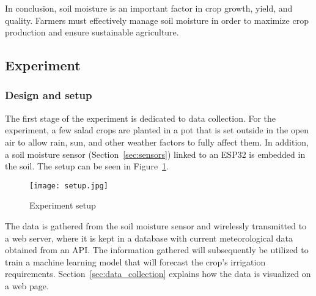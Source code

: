 \documentclass[11pt]{scrartcl} %
\begin{document}
\newline In conclusion, soil moisture is an important factor in crop growth, yield, and quality. Farmers must effectively manage soil moisture in order to maximize crop production and ensure sustainable agriculture.


\subsection{Experiment}
\subsubsection{Design and setup}
The first stage of the experiment is dedicated to data collection. For the experiment, a few salad crops are planted in a pot that is set outside in the open air to allow rain, sun, and other weather factors to fully affect them. In addition, a soil moisture sensor (Section~\ref{sec:sensors}) linked to an ESP32 is embedded in the soil. The setup can be seen in Figure~\ref{fig:experiment_setup}.
\begin{figure}[h]
	\centering
	\texttt{[image: setup.jpg]}
	\caption{Experiment setup}
	\label{fig:experiment_setup}
\end{figure}
The data is gathered from the soil moisture sensor and wirelessly transmitted to a web server, where it is kept in a database with current meteorological data obtained from an API. The information gathered will subsequently be utilized to train a machine learning model that will forecast the crop's irrigation requirements. Section~\ref{sec:data_collection} explains how the data is visualized on a web page.
\end{document}
